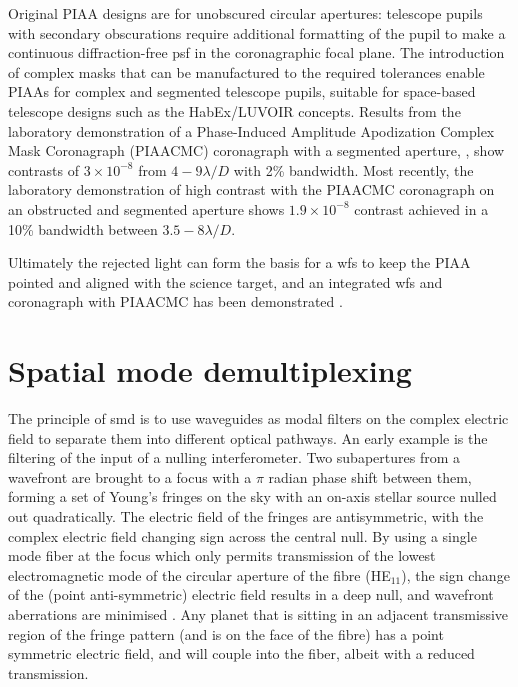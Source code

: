 \documentclass[letterpaper]{ar-1col}
\newcommand{\ld}{$\lambda/D$}
\begin{document}
%
Original PIAA designs are for unobscured circular apertures: telescope pupils with secondary obscurations require additional formatting of the pupil to make a continuous diffraction-free \ac{psf} in the coronagraphic focal plane.
%
The introduction of complex masks that can be manufactured to the required tolerances enable PIAAs for complex and segmented telescope pupils, suitable for space-based telescope designs such as the HabEx/LUVOIR concepts.
%
Results from the laboratory demonstration of a Phase-Induced Amplitude Apodization Complex Mask Coronagraph (PIAACMC) coronagraph with a segmented aperture, \citep{Marx21}, show contrasts of $3\times 10^{-8}$ from $4-9$\ld{} with 2\% bandwidth.
%
Most recently, the laboratory demonstration of high contrast with the PIAACMC coronagraph on an obstructed and segmented aperture \citep{Belikov22} shows $1.9\times 10^{-8}$ contrast achieved in a 10\% bandwidth between $3.5-8$\ld{}.

Ultimately the rejected light can form the basis for a \ac{wfs} to keep the PIAA pointed and aligned with the science target, and an integrated \ac{wfs} and coronagraph with PIAACMC has been demonstrated \citep{Haffert23a}.


\section{Spatial mode demultiplexing}

The principle of \ac{smd} is to use waveguides as modal filters on the complex electric field to separate them into different optical pathways.
%
An early example is the filtering of the input of a nulling interferometer.
%
Two subapertures from a wavefront are brought to a focus with a $\pi$ radian phase shift between them, forming a set of Young's fringes on the sky with an on-axis stellar source nulled out quadratically.
%
The electric field of the fringes are antisymmetric, with the complex electric field changing sign across the central null.
%
By using a single mode fiber at the focus  which only permits transmission of the lowest electromagnetic mode of the circular aperture of the fibre (HE$_{11}$), the sign change of the (point anti-symmetric) electric field results in a deep null, and wavefront aberrations are minimised \citet{Serabyn06,Haguenauer06}.
%
Any planet that is sitting in an adjacent transmissive region of the fringe pattern (and is on the face of the fibre) has a point symmetric electric field, and will couple into the fiber, albeit with a reduced transmission.
\end{document}
